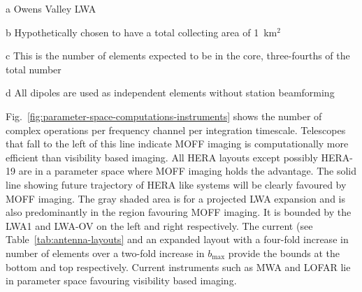 \documentclass[a4paper,fleqn,usenatbib]{../mnras}
\begin{document}
\begin{table}
\begin{threeparttable}
\begin{tabular}{ccccc}
    \hline
  \end{tabular}
  \begin{tablenotes}
    \item[a] Owens Valley LWA
    \item[b] Hypothetically chosen to have a total collecting area of 
      1~km$^2$
    \item[c] This is the number of elements expected to be in the core, 
      three-fourths of the total number
    \item[d] All dipoles are used as independent elements without station 
      beamforming
  \end{tablenotes}
  \end{threeparttable}
\end{table}

Fig.~\ref{fig:parameter-space-computations-instruments} shows the number of 
complex operations per frequency channel per integration timescale. Telescopes 
that fall to the left of this line indicate MOFF imaging is computationally
more efficient than visibility based imaging. All HERA layouts except possibly
HERA-19 are in a parameter space where MOFF imaging holds the advantage. The 
solid line showing future trajectory of HERA like systems will be clearly 
favoured by MOFF imaging. The gray shaded area is for a projected LWA 
expansion and is also predominantly in the region favouring MOFF imaging. 
It is bounded by the LWA1 and LWA-OV on the left and right 
respectively. The current (see Table~\ref{tab:antenna-layouts} and
an expanded layout with a four-fold increase in number of elements over a
two-fold increase in $b_\textrm{max}$ provide the bounds at the bottom and top 
respectively. Current instruments such as MWA and LOFAR lie in parameter space
favouring visibility based imaging. 
\end{document}
